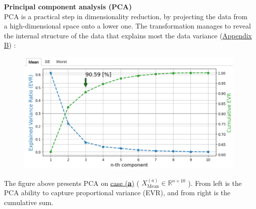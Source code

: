 \documentclass[12pt]{article}
\numberwithin{equation}{section}
\begin{document}
\begin{flushleft}
\textbf{Principal component analysis (PCA)} \\[3mm]
PCA is a practical step in dimensionality reduction, by projecting the data from a high-dimensional space onto a lower one. The transformation manages to reveal the internal structure of the data that explains most the data variance (\hyperlink{PCA}{Appendix B}) :
\begin{figure}[H]
\centering
\includegraphics[width=0.95\linewidth, center]{Mat_mean.png}
\end{figure}
The figure above presents PCA on \underline{case (\textbf{a})} ( $X^{(a)}_{\text{Mean}} \in \mathbb{R}^{n \times 10}$ ). From left is the PCA ability to capture proportional variance (EVR), and from right is the cumulative sum.


\end{flushleft}
\end{document}
